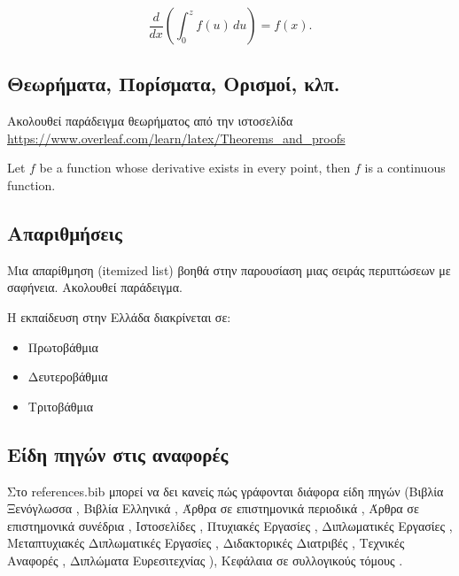      \[
        \frac{d}{dx}\left( \int_{0}^{z} f(u)\,du\right)=f(x).
     \]

\subsection{Θεωρήματα, Πορίσματα, Ορισμοί, κλπ.}

Ακολουθεί παράδειγμα θεωρήματος από την ιστοσελίδα  {\small\url{https://www.overleaf.com/learn/latex/Theorems_and_proofs}}

\begin{theorem}
Let $f$ be a function whose derivative exists in every point, then $f$ 
is a continuous function.
\end{theorem}

\subsection{Απαριθμήσεις}

Μια απαρίθμηση (itemized list) βοηθά στην παρουσίαση μιας σειράς περιπτώσεων με σαφήνεια.
Ακολουθεί παράδειγμα.

H εκπαίδευση στην Ελλάδα διακρίνεται σε:
\begin{itemize}
\item Πρωτοβάθμια 
\item Δευτεροβάθμια 
\item Τριτοβάθμια 
\end{itemize}

\subsection{Είδη πηγών στις αναφορές}

Στο references.bib μπορεί να δει κανείς πώς γράφονται διάφορα είδη πηγών 
(Βιβλία Ξενόγλωσσα \cite{goossens93},
Βιβλία Ελληνικά \cite{greekbook},
Άρθρα σε επιστημονικά περιοδικά \cite{LiArTs13},
Άρθρα σε επιστημονικά συνέδρια \cite{dcis2011},
Ιστοσελίδες \cite{LaTeXProject},
Πτυχιακές Εργασίες \cite{elli05},
Διπλωματικές Εργασίες \cite{zoi04},
Μεταπτυχιακές Διπλωματικές Εργασίες \cite{master04},
Διδακτορικές Διατριβές \cite{phd045},
Τεχνικές Αναφορές \cite{MSU-CSE-05-29},
Διπλώματα Ευρεσιτεχνίας \cite{viswanathan2014convenient}),
Κεφάλαια σε συλλογικούς τόμους
\cite{[PS11]}.

